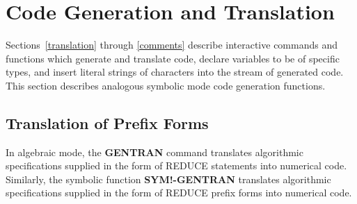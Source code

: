 \section{Code Generation and Translation}
Sections~\ref{translation} through \ref{comments}
describe interactive commands and functions which
generate and translate code, declare variables to be of 
specific types, and insert literal strings of characters into the
stream of generated code.  This section describes analogous symbolic
mode code generation functions.

\subsection{Translation of Prefix Forms}
In algebraic mode, the {\bf GENTRAN} command translates algorithmic
specifications supplied in the form of REDUCE statements into
numerical code.  Similarly, the symbolic function {\bf SYM!-GENTRAN}
translates algorithmic specifications supplied in the form of REDUCE
prefix forms into numerical code.

